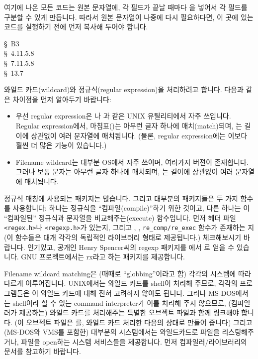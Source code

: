 \begin{faq}
	여기에 나온 모든 코드는 원본 문자열에, 각 필드가 끝날 때마다
        을 넣어서 각 필드를 구분할 수 있게 만듭니다. 따라서 원본
        문자열이 나중에 다시 필요하다면, 이 곳에 있는 코드를 실행하기 전에
        먼저 복사해 두어야 합니다.

\R
	\cite{kr2} \S\ B3  \\
        \cite{ansi} \S\ 4.11.5.8 \\
	\cite{c89} \S\ 7.11.5.8 \\
	\cite{hs} \S\ 13.7  \\
	\cite{pcs} 
\end{faq}

\begin{faq}
	와일드 카드(wildcard)와 정규식(regular expression)을 처리하려고
	합니다.
\A
	다음과 같은 차이점을 먼저 알아두기 바랍니다:
        \begin{itemize}
	  \item 우선 regular expression은 나 과 같은
	    UNIX 유틸리티에서 자주 쓰입니다. Regular expression에서,
            마침표()는 아무런 글자 하나에 매치(match)되며,
            는 길이에 상관없이 여러 문자열에 매치됩니다.
            (물론, regular expression에는 이보다 훨씬 더 많은 기능이
            있습니다.)
          \item Filename wildcard는 대부분 OS에서 자주 쓰이며, 여러가지
            버젼이 존재합니다. 그러나 보통  문자는 아무런 글자 하나에
            매치되며, \TT{*}는 길이에 상관없이 여러 문자열에 매치됩니다.
        \end{itemize}

	정규식 매칭에 사용되는 패키지는 많습니다.  그리고 대부분의 패키지들은
	두 가지 함수를 사용합니다: 하나는 정규식을 ``컴파일(compile)''하기
        위한 것이고, 다른 하나는 이 ``컴파일된'' 정규식과 문자열을 
        비교해주는(execute) 함수입니다.
	먼저 헤더 파일 \verb+<regex.h>+나 \verb+<regexp.h>+가 있는지,
	그리고 , ,
	\verb+re_comp/re_exec+ 함수가 존재하는 지 (이 함수들은 대개
	각각의 독립적인 라이브러리 형태로 제공됩니다.) 체크해보시기 바랍니다.
	인기있고, 공개인 Henry Spencer씨의 regexp 패키지를
	에서 로 얻을 수
	있습니다.  GNU 프로젝트에서는 rx라고 하는 패키지를 제공합니다.

	Filename wildcard matching은 (때때로 ``globbing''이라고 함) 각각의
	시스템에 따라 다르게 이루어집니다.  UNIX에서는 와일드 카드를
	shell이 처리해 주므로, 각각의 프로그램들은 이 와일드 카드에 대해
	전혀 고려하지 않아도 됩니다.  그러나 MS-DOS에서는 shell이라
	할 수 있는 command interpreter가 이를 처리해 주지 않으므로,
	(컴파일러가 제공하는) 와일드 카드를 처리해주는 특별한 오브젝트
        파일과 함께 링크해야 합니다. (이 오브젝트 파일은 를,
        와일드 카드 처리한 다음의 상태로 만들어 줍니다)
        그리고 (MS-DOS와 VMS를 포함한) 대부분의
	시스템에서는 와일드카드로 파일을 리스팅해주거나, 파일을 open하는
	시스템 서비스들을 제공합니다.  먼저 컴파일러/라이브러리의 문서를
	참고하기 바랍니다.  


\end{faq}
